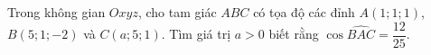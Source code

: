 \begin{ex}
Trong không gian $Oxyz$, cho tam giác $ABC$ có tọa độ các đỉnh $A(1;1;1)$, $B(5;1;-2)$ và $C(a;5;1)$. Tìm giá trị $a>0$ biết rằng $\cos\widehat{BAC}=\dfrac{12}{25}$.
\end{ex}
